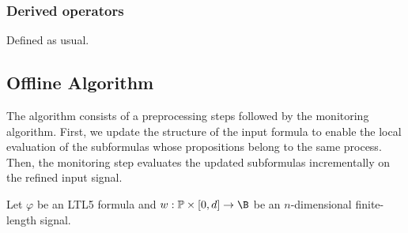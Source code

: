 
\subsubsection{Derived operators}
Defined as usual.

\subsection*{Offline Algorithm} 
The algorithm consists of a preprocessing steps followed by the monitoring algorithm.
First, we update the structure of the input formula to enable the local evaluation of the subformulas whose propositions belong to the same process.
Then, the monitoring step evaluates the updated subformulas incrementally on the refined input signal.


Let $\varphi$ be an LTL5 formula and $w : \mathbb{P} \times [0,d] \to \B$ be an $n$-dimensional finite-length signal.

